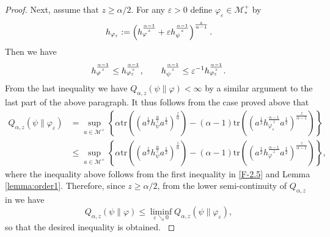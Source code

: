 \documentclass[12pt]{article}
\theoremstyle{definition}
\theoremstyle{remark}
\numberwithin{equation}{section}
\def\Me{\mathcal M}
\def\Tr{\mathrm{tr}}
\def\eps{\varepsilon}
\begin{document}
\begin{proof}
{\color{red}
Next, assume that $z\ge\alpha/2$. For any $\eps>0$ define $\varphi_\eps\in\Me_*^+$ by
\[
h_{\varphi_\eps}:=\left(
h_\varphi^{\alpha-1\over z}+\eps h_\psi^{\alpha-1\over z}\right)^{z\over\alpha-1}.
\]
Then we have
\begin{align}\label{F-2.5}
h_\varphi^{\alpha-1\over z}\le h_{\varphi_\eps}^{\alpha-1\over z},\qquad
h_\psi^{\alpha-1\over z}\le\eps^{-1}h_{\varphi_\eps}^{\alpha-1\over z}.
\end{align}
From the last inequality we have $Q_{\alpha,z}(\psi\|\varphi)<\infty$ by a similar argument to
the last part of the above paragraph. It thus follows from the case proved above that
\begin{align*}
Q_{\alpha,z}(\psi\|\varphi_\varepsilon)&=\sup_{a\in \Me^+} \left\{\alpha
\Tr\left((a^{\frac12}h_\psi^{\frac{\alpha}{z}}a^{\frac12})^{\frac{z}{\alpha}}\right)
-(\alpha-1)\Tr\left((a^{\frac12}h_{\varphi_\eps}^{\frac{\alpha-1}{z}}
a^{\frac12})^{\frac{z}{\alpha-1}}\right)\right\}\\
&\le\sup_{a\in \Me^+} \left\{\alpha
\Tr\left((a^{\frac12}h_\psi^{\frac{\alpha}{z}}a^{\frac12})^{\frac{z}{\alpha}}\right)-(\alpha-1)
\Tr\left((a^{\frac12}h_\varphi^{\frac{\alpha-1}{z}}a^{\frac12})^{\frac{z}{\alpha-1}}\right)
\right\},
\end{align*}
where the inequality above follows from the first inequality in \eqref{F-2.5} and Lemma \ref{lemma:order1}.
Therefore, since $z\ge\alpha/2$, from the lower semi-continuity of $Q_{\alpha,z}$ in
\cite[Theorem 2(iv)]{kato2023onrenyi} we have
\[
Q_{\alpha,z}(\psi\|\varphi)\le \liminf_{\varepsilon\searrow 0}
Q_{\alpha,z}(\psi\|\varphi_\varepsilon),
\]
so that the desired inequality is obtained.
}
\end{proof}


\end{document}
